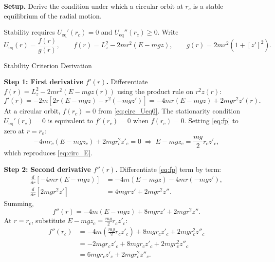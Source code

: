 \documentclass[11pt,letterpaper]{article}
\newcommand{\parhead}[1]{\par\medskip\noindent\textbf{#1}\ignorespaces}
\begin{document}
\parhead{Setup.}
Derive the condition under which a circular orbit at $r_c$ is a stable equilibrium of the radial motion.

Stability requires $U_{\mathrm{eq}}'(r_c)=0$ and $U_{\mathrm{eq}}''(r_c)\ge 0$. Write
\begin{equation}
    U_{\mathrm{eq}}(r) = \frac{f(r)}{g(r)}, \qquad
    f(r) = L_z^2 - 2m r^2(E-mgz), \qquad
    g(r) = 2m r^2(1+[z']^2).
\end{equation}


\begin{derivationbox}{Stability Criterion Derivation}
\parhead{Step 1: First derivative $f'(r)$.}
Differentiate $f(r)=L_z^2-2mr^2(E-mgz(r))$ using the product rule on $r^2 z(r)$:
\begin{equation}
    f'(r) = -2m\left[2r(E-mgz) + r^2(-mgz')\right]
          = -4mr(E-mgz) + 2mgr^2 z'(r).
    \label{eq:fp}
\end{equation}
At a circular orbit, $f(r_c)=0$ from \eqref{eq:circ_Ueq0}. The stationarity condition $U_{\mathrm{eq}}'(r_c)=0$ is equivalent to $f'(r_c)=0$ when $f(r_c)=0$. Setting \eqref{eq:fp} to zero at $r=r_c$:
\begin{equation}
    -4m r_c(E-mgz_c) + 2m g r_c^2 z'_c = 0
    \;\Longrightarrow\;
    E - mgz_c = \frac{mg}{2}r_c z'_c,
\end{equation}
which reproduces \eqref{eq:circ_E}.

\parhead{Step 2: Second derivative $f''(r)$.}
Differentiate \eqref{eq:fp} term by term:
\begin{align}
    \frac{d}{dr}[-4mr(E-mgz)]
    &= -4m(E-mgz) -4mr(-mgz'), \\
    \frac{d}{dr}[2mgr^2 z']
    &= 4mgrz' + 2mgr^2 z''.
\end{align}
Summing,
\begin{equation}
    f''(r) = -4m(E-mgz) + 8mgrz' + 2mgr^2 z''.
    \label{eq:fpp}
\end{equation}
At $r=r_c$, substitute $E-mgz_c = \tfrac{mg}{2}r_c z'_c$:
\begin{align}
    f''(r_c)
    &= -4m\left(\frac{mg}{2}r_c z'_c\right) + 8mg r_c z'_c + 2mg r_c^2 z''_c \nonumber \\
    &= -2mg r_c z'_c + 8mg r_c z'_c + 2mg r_c^2 z''_c \nonumber \\
    &= 6mg r_c z'_c + 2mg r_c^2 z''_c.
\end{align}


\end{derivationbox}
\end{document}

